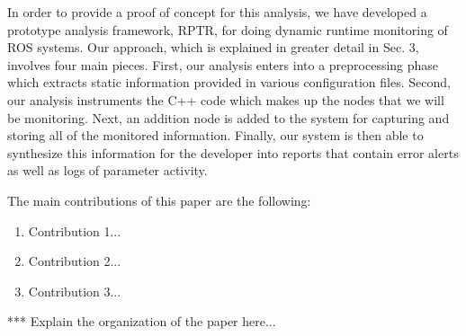 In order to provide a proof of concept for this analysis, we have developed a prototype analysis framework, RPTR, for doing dynamic runtime monitoring of ROS systems. Our approach, which is explained in greater detail in Sec. 3, involves four main pieces. First, our analysis enters into a preprocessing phase which extracts static information provided in various configuration files. Second, our analysis instruments the C++ code which makes up the nodes that we will be monitoring. Next, an addition node is added to the system for capturing and storing all of the monitored information. Finally, our system is then able to synthesize this information for the developer into reports that contain error alerts as well as logs of parameter activity.

The main contributions of this paper are the following:
\begin{enumerate}
	\item Contribution 1...
	\item Contribution 2...
	\item Contribution 3...
\end{enumerate}

*** Explain the organization of the paper here...
